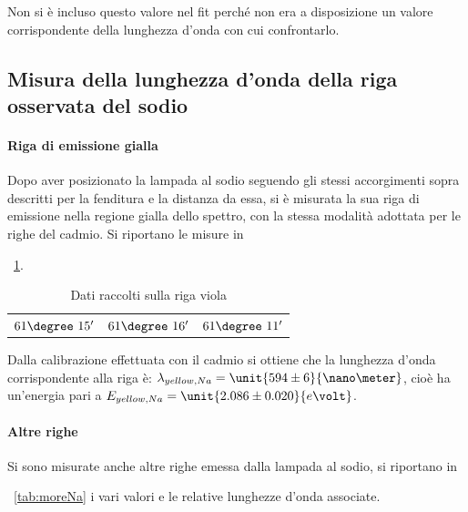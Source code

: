 \documentclass[a4paper,10pt]{article}
\begin{document}
{{{{Non si è incluso questo valore nel fit perché non era a disposizione un valore corrispondente della lunghezza d'onda con cui confrontarlo.

\subsection{Misura della lunghezza d’onda della riga osservata del sodio}

\paragraph{Riga di emissione gialla}
Dopo aver posizionato la lampada al sodio seguendo gli stessi accorgimenti sopra descritti per la fenditura e la distanza da essa, si è misurata la sua riga di emissione nella regione gialla dello spettro, con la stessa modalità adottata per le righe del cadmio.
Si riportano le misure in \tablename{~\ref{tab:gialloNa}.

\begin{table}[H]
	\centering
	\begin{tabular}{c|c|c}
		$61\degree~15'$  & $61\degree~16'$ & $61\degree~11'$\\
	\end{tabular}
	\caption{Dati raccolti sulla riga viola}
	\label{tab:gialloNa}
\end{table}

Dalla calibrazione effettuata con il cadmio si ottiene che la lunghezza d'onda corrispondente alla riga è: $\lambda_{yellow, Na} = \unit{594 \pm 6}{\nano\meter}$, cioè ha un'energia pari a $E_{yellow, Na} = \unit{2.086\pm0.020}{e\volt}$.

\paragraph{Altre righe}

Si sono misurate anche altre righe emessa dalla lampada al sodio, si riportano in \tablename{~\ref{tab:moreNa} i vari valori e le relative lunghezze d'onda associate.

}}}}}}
\end{document}
